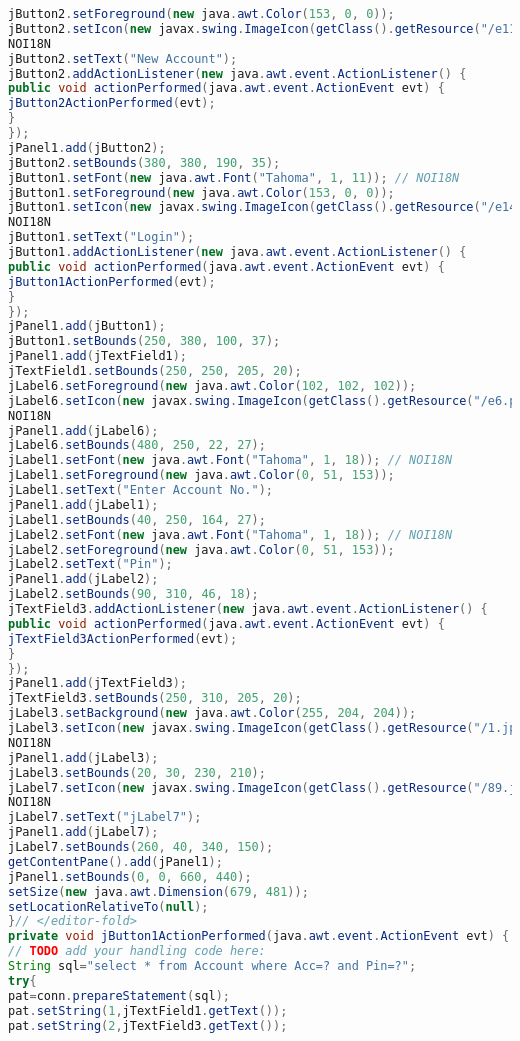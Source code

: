 \begin{lstlisting}[language=Java]
jButton2.setForeground(new java.awt.Color(153, 0, 0));
jButton2.setIcon(new javax.swing.ImageIcon(getClass().getResource("/e11.png"))); //
NOI18N
jButton2.setText("New Account");
jButton2.addActionListener(new java.awt.event.ActionListener() {
public void actionPerformed(java.awt.event.ActionEvent evt) {
jButton2ActionPerformed(evt);
}
});
jPanel1.add(jButton2);
jButton2.setBounds(380, 380, 190, 35);
jButton1.setFont(new java.awt.Font("Tahoma", 1, 11)); // NOI18N
jButton1.setForeground(new java.awt.Color(153, 0, 0));
jButton1.setIcon(new javax.swing.ImageIcon(getClass().getResource("/e14.png"))); //
NOI18N
jButton1.setText("Login");
jButton1.addActionListener(new java.awt.event.ActionListener() {
public void actionPerformed(java.awt.event.ActionEvent evt) {
jButton1ActionPerformed(evt);
}
});
jPanel1.add(jButton1);
jButton1.setBounds(250, 380, 100, 37);
jPanel1.add(jTextField1);
jTextField1.setBounds(250, 250, 205, 20);
jLabel6.setForeground(new java.awt.Color(102, 102, 102));
jLabel6.setIcon(new javax.swing.ImageIcon(getClass().getResource("/e6.png"))); //
NOI18N
jPanel1.add(jLabel6);
jLabel6.setBounds(480, 250, 22, 27);
jLabel1.setFont(new java.awt.Font("Tahoma", 1, 18)); // NOI18N
jLabel1.setForeground(new java.awt.Color(0, 51, 153));
jLabel1.setText("Enter Account No.");
jPanel1.add(jLabel1);
jLabel1.setBounds(40, 250, 164, 27);
jLabel2.setFont(new java.awt.Font("Tahoma", 1, 18)); // NOI18N
jLabel2.setForeground(new java.awt.Color(0, 51, 153));
jLabel2.setText("Pin");
jPanel1.add(jLabel2);
jLabel2.setBounds(90, 310, 46, 18);
jTextField3.addActionListener(new java.awt.event.ActionListener() {
public void actionPerformed(java.awt.event.ActionEvent evt) {
jTextField3ActionPerformed(evt);
}
});
jPanel1.add(jTextField3);
jTextField3.setBounds(250, 310, 205, 20);
jLabel3.setBackground(new java.awt.Color(255, 204, 204));
jLabel3.setIcon(new javax.swing.ImageIcon(getClass().getResource("/1.jpg"))); //
NOI18N
jPanel1.add(jLabel3);
jLabel3.setBounds(20, 30, 230, 210);
jLabel7.setIcon(new javax.swing.ImageIcon(getClass().getResource("/89.jpg"))); //
NOI18N
jLabel7.setText("jLabel7");
jPanel1.add(jLabel7);
jLabel7.setBounds(260, 40, 340, 150);
getContentPane().add(jPanel1);
jPanel1.setBounds(0, 0, 660, 440);
setSize(new java.awt.Dimension(679, 481));
setLocationRelativeTo(null);
}// </editor-fold>
private void jButton1ActionPerformed(java.awt.event.ActionEvent evt) {
// TODO add your handling code here:
String sql="select * from Account where Acc=? and Pin=?";
try{
pat=conn.prepareStatement(sql);
pat.setString(1,jTextField1.getText());
pat.setString(2,jTextField3.getText());

\end{lstlisting}
